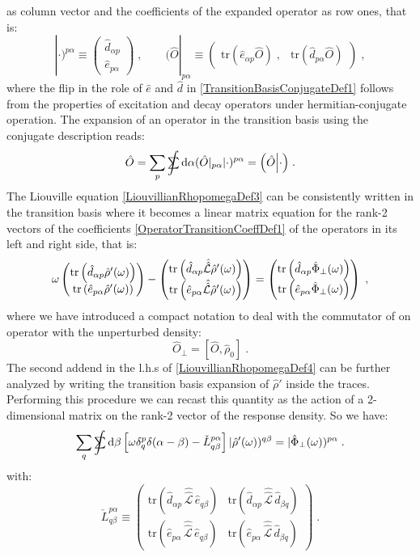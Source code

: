 \documentclass[a4paper]{article}
\newcommand{\dd}{{\rm d}}
\newcommand{\sint}{\mathrlap{\displaystyle\int}
\mathrlap{\textstyle\sum}
\phantom{\mathrlap{\displaystyle
\int}\textstyle\sum}}
\newcommand{\be}{\begin{equation}}
\newcommand{\ee}{\end{equation}}
\newcommand{\nn}{\notag}
\newcommand{\qq}{\qquad}
\newcommand{\lb}{\label}
\newcommand{\mat}[1]{\begin{pmatrix} #1\end{pmatrix}}
\newcommand{\op}[1]{\hat {#1}}
\newcommand{\sop}[1]{\op{\op {#1}}}
\newcommand{\commutator}[2]{\left[ {#1} , {#2} \right]}
\newcommand{\trace}[1]{\mathrm{tr}\left(#1\right)}
\newcommand{\optr}[1]{\check #1}
\newcommand{\opskew}[1]{{\op {#1}}_{\perp}}
\newcommand{\sket}[2]{| #2)^{#1}}
\newcommand{\sbra}[2]{( #2|_{#1}}
\newcommand{\dbraket}[2]{\Bigl(#1 \Bigl| #2 \Bigr)}
\newcommand{\dmnot}{\op{\rho}_0}
\newcommand{\dm}{\op{\rho}}
\newcommand{\excite}[2]{\op e_{{#1}{#2}}}
\newcommand{\decay}[2]{\op d_{{#1}{#2}}}
\newcommand{\Liouv}{\sop{\mathcal L}}
\begin{document}
as column vector and the coefficients of the expanded operator as row ones, that is: 
\be\lb{TransitionBasisConjugateDef1}
\sket{p\alpha}{\cdot} \equiv 
\mat{\decay{\alpha}{p} \\  \excite{p}{\alpha}} \;, \qq
\sbra{p\alpha}{\op O}  \equiv 
\mat{ \trace{\excite{\alpha}{p}\op O } \;, & \trace{\decay{p}{\alpha}\op O} }
\;,
\ee
where the flip in the role of $\op e$ and $\op d$ in \eqref{TransitionBasisConjugateDef1} follows from the properties of excitation and decay operators
under hermitian-conjugate operation. The expansion of an operator in the transition basis using the conjugate description reads: 
\be\lb{OperatorTransBasisConjugateExpDef1}
\op O = \sum_p\sint \dd \alpha \sbra{p\alpha}{\op O}\sket{p\alpha}{\cdot} = 
\dbraket{\op O}{\cdot} \;.
\ee
The Liouville equation \eqref{LiouvillianRhopomegaDef3} can be consistently written in the transition basis where it becomes a linear matrix equation for the 
rank-2 vectors of the coefficients \eqref{OperatorTransitionCoeffDef1} of the operators in its left and right side, that is:
\be\lb{LiouvillianRhopomegaDef4}
\omega\mat{ \trace{\decay{\alpha}{p}\dm'(\omega)} \\ \trace{\excite{p}{\alpha}\dm'(\omega)}} - 
\mat{ \trace{\decay{\alpha}{p}\Liouv\dm'(\omega)} \\ \trace{\excite{p}{\alpha}\Liouv\dm'(\omega)}} =
\mat{ \trace{\decay{\alpha}{p}\opskew{\Phi}(\omega)} \\ \trace{\excite{p}{\alpha}\opskew{\Phi}(\omega)}}
\;,\nn
\ee
where we have introduced a compact notation to deal with the commutator of on operator with the unperturbed density: 
\be
\opskew{O} = \commutator{\op O}{\dmnot}\;.
\ee
The second addend in the l.h.s of \eqref{LiouvillianRhopomegaDef4} can be further analyzed by writing the transition basis expansion of $\dm'$ inside the traces. 
Performing this procedure we can recast this quantity as the action of a 2-dimensional matrix on the rank-2 vector of the response density. So we have: 
\be\lb{LiouvilleTransBasisDef1}
\sum_q\sint\dd\beta \left[\omega\delta_q^p\delta(\alpha-\beta)- \optr{L}^{p \alpha}_{q\beta} \right]\sket{q\beta}{\dm'(\omega)} =
\sket{p\alpha}{\opskew{\Phi}(\omega)} \;.
\ee
with:
\be\lb{LiouvilleMatrixTransBasisDef1}
\optr{L}^{p \alpha}_{q\beta} \equiv \mat{\trace{\decay{\alpha}{p}\, \Liouv\, \excite{q}{\beta}} &
\trace{\decay{\alpha}{p}\, \Liouv\, \decay{\beta}{q}} \\
\trace{\excite{p}{\alpha}\, \Liouv\, \excite{q}{\beta}} &
\trace{\excite{p}{\alpha}\, \Liouv\, \decay{\beta}{q}}} \;.
\ee
\end{document}

